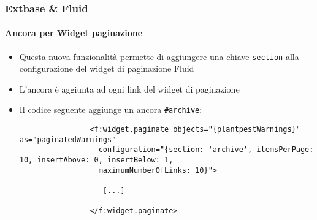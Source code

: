 \begin{frame}[fragile]
	\frametitle{Extbase \& Fluid}
	\framesubtitle{Ancora per Widget paginazione}

	\lstset{basicstyle=\tiny\ttfamily}

	\begin{itemize}

		\item Questa nuova funzionalità permette di aggiungere una chiave \texttt{section} alla configurazione del
			 widget di paginazione Fluid

		\item L'ancora è aggiunta ad ogni link del widget di paginazione

		\item Il codice seguente aggiunge un ancora \texttt{\#archive}:

			\begin{lstlisting}
				<f:widget.paginate objects="{plantpestWarnings}" as="paginatedWarnings"
				  configuration="{section: 'archive', itemsPerPage: 10, insertAbove: 0, insertBelow: 1,
				  maximumNumberOfLinks: 10}">

				   [...]

				</f:widget.paginate>
			\end{lstlisting}

	\end{itemize}

\end{frame}


